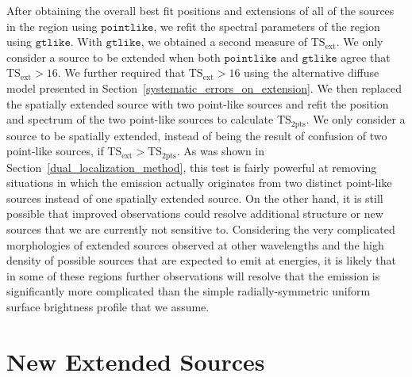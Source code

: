 \documentclass[12pt,preprint]{aastex}
\newcommand{\gev}{\text{GeV}\xspace}
\newcommand{\tsext}{{\ensuremath{\text{TS}_{\text{ext}}}}\xspace}
\newcommand{\tsinc}{\ensuremath{\text{TS}_{\text{2pts}}}\xspace}
\newcommand{\gtlike}{\ensuremath{\mathtt{gtlike}}\xspace}
\newcommand{\pointlike}{\ensuremath{\mathtt{pointlike}}\xspace}
\begin{document}
After obtaining the overall best fit positions and extensions of all
of the sources in the region using \pointlike, we refit the spectral
parameters of the region using \gtlike.  With \gtlike, we obtained a
second measure of \tsext.  We only consider a source to be extended when
both \pointlike and \gtlike agree that $\tsext>16$. 
We further required that $\tsext>16$ using the alternative diffuse
model presented in Section~\ref{systematic_errors_on_extension}.
We then replaced the spatially extended source with two point-like
sources and refit the position and spectrum of the
two point-like sources to calculate \tsinc.
We only consider a source to be spatially extended, instead of being
the result of confusion of two point-like sources, if $\tsext>\tsinc$.
As was shown in Section~\ref{dual_localization_method}, this test is
fairly powerful at removing situations in which the emission actually
originates from two distinct point-like sources instead of one spatially
extended source.  On the other hand, it is still possible that improved
observations could resolve additional structure or new sources that we are
currently not sensitive to. Considering the very complicated morphologies
of extended sources observed at other wavelengths and the high density
of possible sources that are expected to emit at \gev energies, it is
likely that in some of these regions further observations will resolve
that the emission is significantly more complicated than the simple
radially-symmetric uniform surface brightness profile that we assume.


\section{New Extended Sources}
\label{new_ext_srcs_section}


\end{document}
